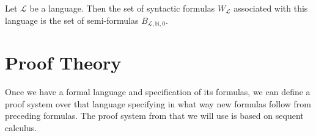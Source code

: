 \begin{definition}\label{def:syn-f}
    \leanok
    Let $\mathcal{L}$ be a language. Then the set of syntactic formulas $W_{\mathcal{L}}$ associated with this language is the set of semi-formulas $B_{\mathcal{L},\mathbb{N},0}$.
\end{definition}

\section{Proof Theory}
Once we have a formal language and specification of its formulas, we can define a proof system over that language specifying in what way new formulas follow from preceding formulas. The proof system from \cite{ffl} that we will use is based on sequent calculus.

\begin{definition}\label{def:seq-calc}
    \leanok
    
\end{definition}



